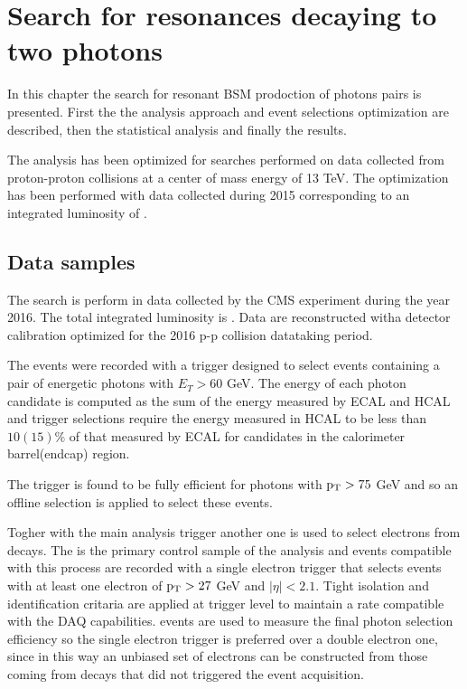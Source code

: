 \chapter{Search for resonances decaying to two photons}
\label{chapter:diphotons}

In this chapter the search for resonant BSM prodoction of photons pairs is presented.
First the the analysis approach and event selections optimization are described, then
the statistical analysis and finally the results.

The analysis has been optimized for searches performed on data collected from proton-proton
collisions at a center of mass energy of 13 TeV. The optimization has been performed with
data collected during 2015 corresponding to an integrated luminosity of \lumififBon.

\section{Data samples}
The search is perform in data collected by the CMS experiment during the year 2016. The total
integrated luminosity is \lumisix. Data are reconstructed witha detector calibration optimized
for the 2016 p-p collision datataking period.

The events were recorded with a trigger designed to select events containing a pair of
energetic photons with $E_T > 60$ GeV. The energy of each photon candidate is computed as
the sum of the energy measured by ECAL and HCAL and trigger selections require
the energy measured in HCAL to be less than $10(15)\%$ of that measured by ECAL for candidates
in the calorimeter barrel(endcap) region.

The trigger is found to be fully efficient for photons with $\mathrm{p_{T}} > 75$ GeV and so an offline
selection is applied to select these events.

Togher with the main analysis trigger another one is used to select electrons from \Zee decays.
The \Zee is the primary control sample of the analysis and events compatible with this process
are recorded with a single electron trigger that selects events with at least one electron of
$\mathrm{p_{T}} > 27$ GeV and $|\eta| < 2.1$. Tight isolation and identification critaria are applied at trigger
level to maintain a rate compatible with the DAQ capabilities.
\Zee events are used to measure the final photon selection efficiency so the single electron trigger
is preferred over a double electron one, since in this way an unbiased set of electrons can be
constructed from those coming from \Zee decays that did not triggered the event acquisition.

